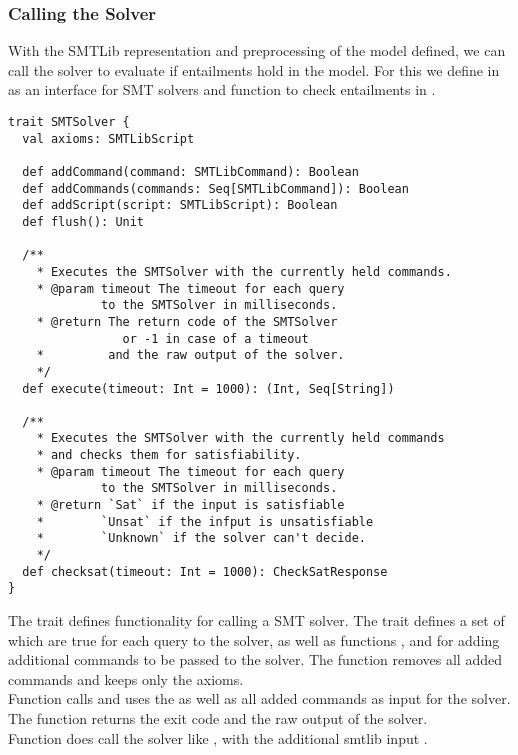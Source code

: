 \subsubsection{Calling the Solver}
With the SMTLib representation and preprocessing
of the model defined, we can call the solver
to evaluate if entailments 
hold in the model.
For this we define 
in  as an interface for SMT solvers
and function  to check entailments
in .
%
\begin{lstlisting}[caption={SMTSolver Interface},label=lst:smtsolver,captionpos=b,frame={lines}]
trait SMTSolver {
  val axioms: SMTLibScript

  def addCommand(command: SMTLibCommand): Boolean
  def addCommands(commands: Seq[SMTLibCommand]): Boolean
  def addScript(script: SMTLibScript): Boolean
  def flush(): Unit

  /**
    * Executes the SMTSolver with the currently held commands.
    * @param timeout The timeout for each query
             to the SMTSolver in milliseconds.
    * @return The return code of the SMTSolver
                or -1 in case of a timeout
    *         and the raw output of the solver.
    */
  def execute(timeout: Int = 1000): (Int, Seq[String])

  /**
    * Executes the SMTSolver with the currently held commands
    * and checks them for satisfiability.
    * @param timeout The timeout for each query
             to the SMTSolver in milliseconds.
    * @return `Sat` if the input is satisfiable
    *        `Unsat` if the infput is unsatisfiable
    *        `Unknown` if the solver can't decide.
    */
  def checksat(timeout: Int = 1000): CheckSatResponse
}
\end{lstlisting}
%
The trait  defines
functionality for calling a SMT solver.
The trait defines a set of 
which are true for each query to the solver,
as well as functions ,
 and 
for adding additional commands to be passed to the solver.
The function  removes all added commands
and keeps only the axioms.\\
Function  calls
and uses the  as well as
all added commands as input for the solver.
The function returns the exit code
and the raw output of the solver.\\
Function  does call
the solver like , with the
additional smtlib input .
